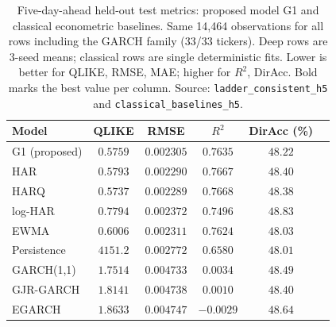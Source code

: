 \documentclass[runningheads]{llncs}
\newcommand{\ntest}{14{,}464}
\newcommand{\nseed}{3}
\begin{document}
\begin{table}[t]
\caption{Five-day-ahead held-out test metrics: proposed model G1 and classical econometric baselines. Same
\ntest{} observations for all rows including the GARCH family (33/33 tickers). Deep rows are \nseed-seed means;
classical rows are single deterministic fits. Lower is better for QLIKE, RMSE, MAE; higher for $R^2$,
DirAcc. Bold marks the best value per column. Source:
\texttt{ladder\_consistent\_h5} and \texttt{classical\_baselines\_h5}.}
\label{tab:classical}
\centering
\begin{tabular}{lccccc}
\toprule
Model & QLIKE & RMSE & $R^2$ & DirAcc (\%) \\
\midrule
G1 (proposed)     & $0.5759$          & $0.002305$          & $0.7635$          & $48.22$ \\
HAR               & $0.5793$          & $0.002290$          & $0.7667$          & $48.40$ \\
HARQ              & $\mathbf{0.5737}$ & $\mathbf{0.002289}$ & $\mathbf{0.7668}$ & $48.38$ \\
log-HAR           & $0.7794$          & $0.002372$          & $0.7496$          & $\mathbf{48.83}$ \\
EWMA              & $0.6006$          & $0.002311$          & $0.7624$          & $48.03$ \\
Persistence       & $4151.2$          & $0.002772$          & $0.6580$          & $48.01$ \\
GARCH(1,1)        & $1.7514$          & $0.004733$          & $0.0034$          & $48.49$ \\
GJR-GARCH         & $1.8141$          & $0.004738$          & $0.0010$          & $48.40$ \\
EGARCH            & $1.8633$          & $0.004747$          & $-0.0029$         & $48.64$ \\
\bottomrule
\end{tabular}
\end{table}
\end{document}

